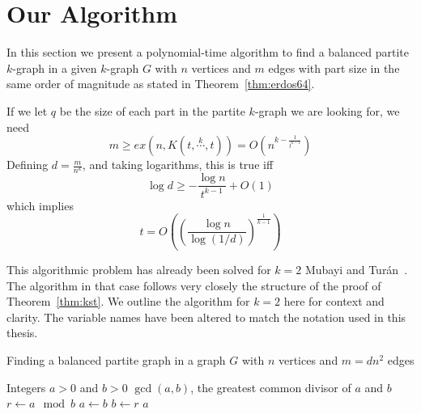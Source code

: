 \section{Our Algorithm}\label{sec:algorithm}

In this section we present a polynomial-time algorithm to find a balanced partite $k$-graph in a given $k$-graph $G$
with $n$ vertices and $m$ edges with part size in the same order of magnitude as stated in
Theorem~\ref{thm:erdos64}.

\begin{remark}
    If we let $q$ be the size of each part in the partite $k$-graph we are looking for, we need
    \[
        m \geq ex(n, K(t, \overset{k}{\cdots}, t)) = O\left(n^{k - \frac{1}{t^{k-1}}}\right)
    \]
    Defining $d = \frac{m}{n^k}$, and taking logarithms, this is true iff
    \[
        \log d \geq - \frac{\log n}{t^{k-1}} + O(1)
    \]
    which implies
    \[
        t = O\left(\left(\frac{\log n}{\log (1/d)}\right)^{\frac{1}{k-1}}\right)
    \]
\end{remark}

This algorithmic problem has already been solved for $k = 2$ Mubayi and Turán~\cite{MUBAYI2010174}.
The algorithm in that case follows very closely the structure of the proof of Theorem~\ref{thm:kst}.
We outline the algorithm for $k = 2$ here for context and clarity.
The variable names have been altered to match the notation used in this thesis.

\begin{algorithm}
    \caption{Finding a balanced partite graph in a graph $G$ with $n$ vertices and $m = dn^2$ edges}
    \label{alg:bipartite}
        \begin{algorithmic}[1]
        \Require Integers \(a > 0\) and \(b > 0\)
        \Ensure \( \gcd(a, b) \), the greatest common divisor of \(a\) and \(b\)
            \State $r \gets a \mod b$ 
            \State $a \gets b$
            \State $b \gets r$
        \EndWhile
        \State \Return $a$ 
        \end{algorithmic}
\end{algorithm}
